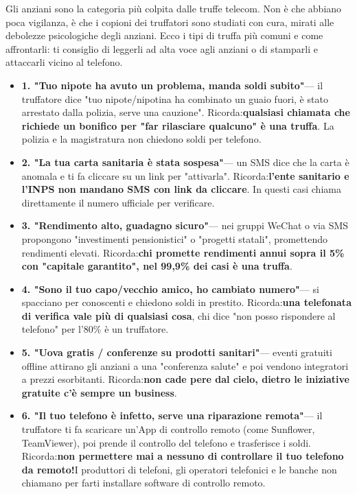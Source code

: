 Gli anziani sono la categoria più colpita dalle truffe telecom. Non è che abbiano poca vigilanza, è che i copioni dei truffatori sono studiati con cura, mirati alle debolezze psicologiche degli anziani. Ecco i tipi di truffa più comuni e come affrontarli: ti consiglio di leggerli ad alta voce agli anziani o di stamparli e attaccarli vicino al telefono.


\begin{itemize}
  \item \textbf{1. "Tuo nipote ha avuto un problema, manda soldi subito"}— il truffatore dice "tuo nipote/nipotina ha combinato un guaio fuori, è stato arrestato dalla polizia, serve una cauzione". Ricorda:\textbf{qualsiasi chiamata che richiede un bonifico per "far rilasciare qualcuno" è una truffa}. La polizia e la magistratura non chiedono soldi per telefono.
  \item \textbf{2. "La tua carta sanitaria è stata sospesa"}— un SMS dice che la carta è anomala e ti fa cliccare su un link per "attivarla". Ricorda:\textbf{l'ente sanitario e l'INPS non mandano SMS con link da cliccare}. In questi casi chiama direttamente il numero ufficiale per verificare.
  \item \textbf{3. "Rendimento alto, guadagno sicuro"}— nei gruppi WeChat o via SMS propongono "investimenti pensionistici" o "progetti statali", promettendo rendimenti elevati. Ricorda:\textbf{chi promette rendimenti annui sopra il 5\% con "capitale garantito", nel 99,9\% dei casi è una truffa}.
  \item \textbf{4. "Sono il tuo capo/vecchio amico, ho cambiato numero"}— si spacciano per conoscenti e chiedono soldi in prestito. Ricorda:\textbf{una telefonata di verifica vale più di qualsiasi cosa}, chi dice "non posso rispondere al telefono" per l'80\% è un truffatore.
  \item \textbf{5. "Uova gratis / conferenze su prodotti sanitari"}— eventi gratuiti offline attirano gli anziani a una "conferenza salute" e poi vendono integratori a prezzi esorbitanti. Ricorda:\textbf{non cade pere dal cielo, dietro le iniziative gratuite c'è sempre un business}.
  \item \textbf{6. "Il tuo telefono è infetto, serve una riparazione remota"}— il truffatore ti fa scaricare un'App di controllo remoto (come Sunflower, TeamViewer), poi prende il controllo del telefono e trasferisce i soldi. Ricorda:\textbf{non permettere mai a nessuno di controllare il tuo telefono da remoto!}I produttori di telefoni, gli operatori telefonici e le banche non chiamano per farti installare software di controllo remoto.
\end{itemize}

